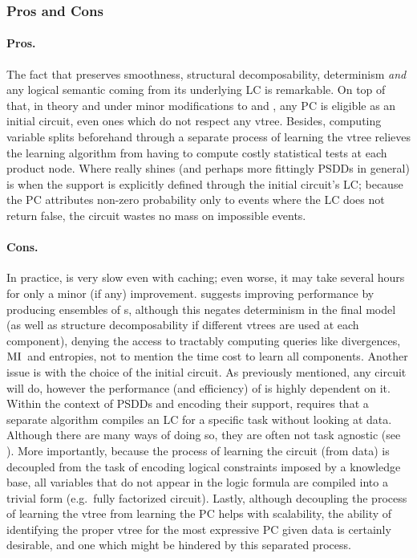\subsubsection{Pros and Cons}

\paragraph{Pros.} The fact that  preserves smoothness, structural
decomposability, determinism \emph{and} any logical semantic coming from its underlying LC is
remarkable. On top of that, in theory and under minor modifications to  and
, any PC is eligible as an initial circuit, even ones which do not respect any
vtree. Besides, computing variable splits beforehand through a separate process of learning the
vtree relieves the learning algorithm from having to compute costly statistical tests at each
product node. Where  really shines (and perhaps more fittingly PSDDs in
general) is when the support is explicitly defined through the initial circuit's LC; because the PC
attributes non-zero probability only to events where the LC does not return false, the circuit
wastes no mass on impossible events.

\paragraph{Cons.} In practice,  is very slow even with caching; even worse, it
may take several hours for only a minor (if any) improvement. \citep{liang17} suggests improving
performance by producing ensembles of s, although this negates determinism in
the final model (as well as structure decomposability if different vtrees are used at each
component), denying the access to tractably computing queries like divergences, $\operatorname{\normalfont{MI}}{}$ and
entropies, not to mention the time cost to learn all components. Another issue is with the choice
of the initial circuit. As previously mentioned, any circuit will do, however the performance (and
efficiency) of  is highly dependent on it. Within the context of PSDDs and
encoding their support,  requires that a separate algorithm compiles an LC for
a specific task without looking at data. Although there are many ways of doing so, they are often
not task agnostic (see ). More importantly, because the process of learning the
circuit (from data) is decoupled from the task of encoding logical constraints imposed by a
knowledge base, all variables that do not appear in the logic formula are compiled into a trivial
form (e.g.\ fully factorized circuit). Lastly, although decoupling the process of learning the
vtree from learning the PC helps with scalability, the ability of identifying the proper vtree for
the most expressive PC given data is certainly desirable, and one which might be hindered by this
separated process.

